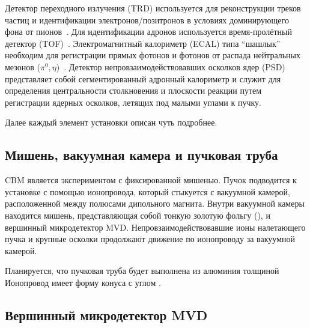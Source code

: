 Детектор переходного излучения (TRD) используется для реконструкции треков частиц и идентификации электронов/позитронов в условиях доминирующего фона от пионов~\cite{TRD}. Для идентификации адронов используется время-пролётный детектор (TOF)~\cite{TDR_TOF}. Электромагнитный калориметр (ECAL) типа ``шашлык'' необходим для регистрации прямых фотонов и фотонов от распада нейтральных мезонов ($ \pi^{0}, \eta $)~\cite{ECAL_KOROLKO}. Детектор непровзаимодействовавших осколков ядер (PSD)~\cite{TDR_PSD} представляет собой сегментированный адронный калориметр и служит для определения центральности столкновения и плоскости реакции путем регистрации ядерных осколков, летящих под малыми углами к пучку.

Далее каждый элемент установки описан чуть подробнее.


\subsection{Мишень, вакуумная камера и пучковая труба}\label{sec:secVacChamberPipe}

CBM является экспериментом с фиксированной мишенью. Пучок подводится к установке с помощью ионопровода, который стыкуется с вакуумной камерой, расположенной между полюсами дипольного магнита. Внутри вакуумной камеры находится мишень, представляющая собой тонкую золотую фольгу (\todo), и вершинный микродетектор MVD. Непровзаимодействовавшие ионы налетающего пучка и крупные осколки продолжают движение по ионопроводу за вакуумной камерой.

Планируется, что пучковая труба будет выполнена из алюминия толщиной \todo
Ионопровод имеет форму конуса с углом \todo.


\subsection{Вершинный микродетектор MVD}\label{sec:secMVD}


